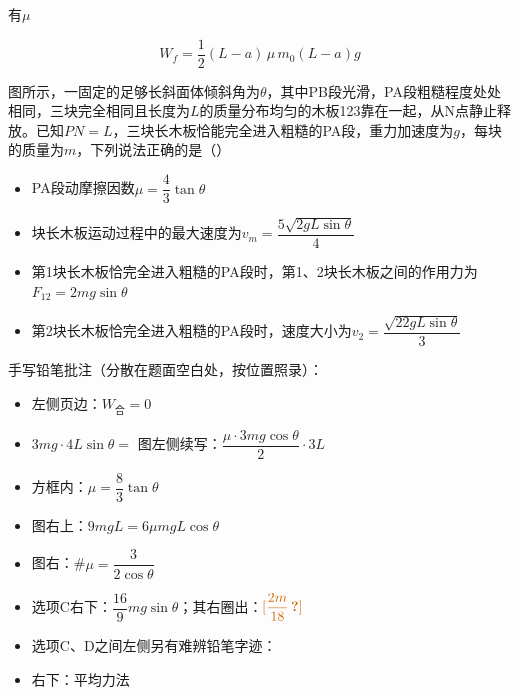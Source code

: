 有$\mu$

\[ W_f=\frac{1}{2}(L-a)\,\mu\, m_0 (L-a) g \]

\begin{problem}[贴纸印刷题]
图所示，一固定的足够长斜面体倾斜角为$\theta$，其中PB段光滑，PA段粗糙程度处处相同，三块完全相同且长度为$L$的质量分布均匀的木板123靠在一起，从N点静止释放。已知$PN=L$，三块长木板恰能完全进入粗糙的PA段，重力加速度为$g$，每块的质量为$m$，下列说法正确的是（） %

\begin{itemize}
\item[A.] PA段动摩擦因数$\mu=\dfrac{4}{3}\tan\theta$ %
\item[B.] 块长木板运动过程中的最大速度为$v_m=\dfrac{5\sqrt{2gL\sin\theta}}{4}$ %
\item[C.] 第1块长木板恰完全进入粗糙的PA段时，第1、2块长木板之间的作用力为$F_{12}=2mg\sin\theta$ %
\item[D.] 第2块长木板恰完全进入粗糙的PA段时，速度大小为$v_2=\dfrac{\sqrt{22gL\sin\theta}}{3}$ %
\end{itemize}


\begin{solution}
手写铅笔批注（分散在题面空白处，按位置照录）：
\begin{itemize}
\item 左侧页边：$W_{\text{合}}=0$
\item $3mg\cdot4L\sin\theta=$ \quad 图左侧续写：$\dfrac{\mu\cdot3mg\cos\theta}{2}\cdot3L$
\item 方框内：$\mu=\dfrac{8}{3}\tan\theta$
\item 图右上：$9mgL=6\mu mgL\cos\theta$ %
\item 图右：\#\quad $\mu=\dfrac{3}{2\cos\theta}$
\item 选项C右下：$\dfrac{16}{9}mg\sin\theta$；其右圈出：$\unclear{\dfrac{2m}{18}}$ %
\item 选项C、D之间左侧另有难辨铅笔字迹：
\item 右下：平均力法\ 
\end{itemize}
\end{solution}
\end{problem}

